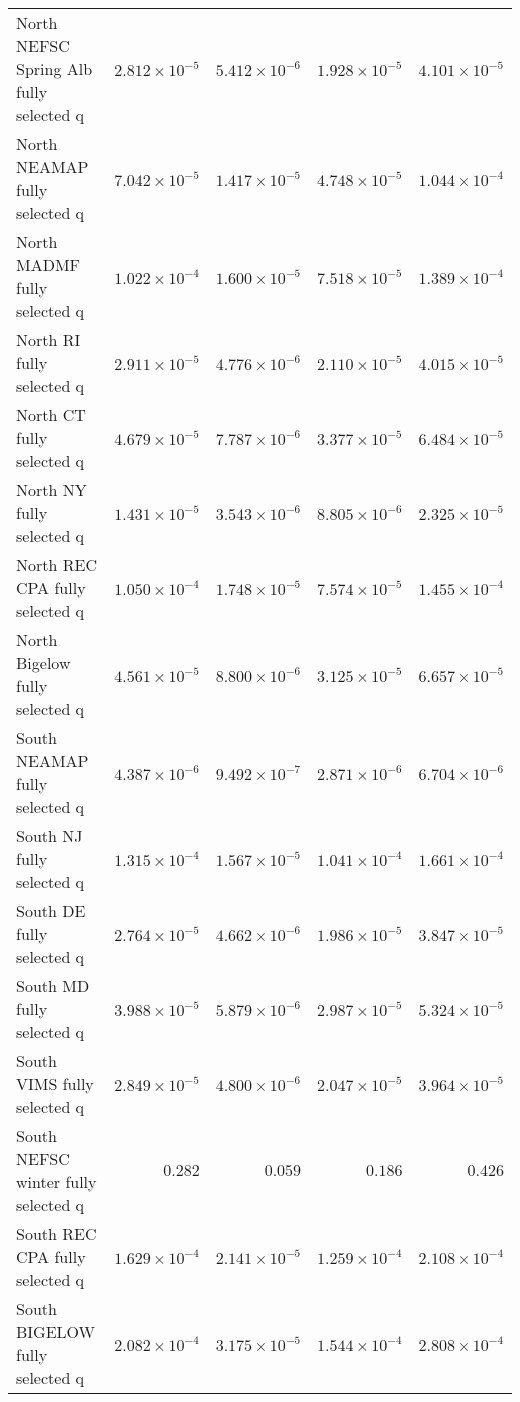 \documentclass[
]{article}
\begin{document}
\begin{landscape}
\begin{longtable}[t]{lrrrr}
\addlinespace
North NEFSC Spring Alb fully selected q & $2.812\times 10^{-5}$ & $5.412\times 10^{-6}$ & $1.928\times 10^{-5}$ & $4.101\times 10^{-5}$\\
North NEAMAP fully selected q & $7.042\times 10^{-5}$ & $1.417\times 10^{-5}$ & $4.748\times 10^{-5}$ & $1.044\times 10^{-4}$\\
North MADMF fully selected q & $1.022\times 10^{-4}$ & $1.600\times 10^{-5}$ & $7.518\times 10^{-5}$ & $1.389\times 10^{-4}$\\
North RI fully selected q & $2.911\times 10^{-5}$ & $4.776\times 10^{-6}$ & $2.110\times 10^{-5}$ & $4.015\times 10^{-5}$\\
North CT fully selected q & $4.679\times 10^{-5}$ & $7.787\times 10^{-6}$ & $3.377\times 10^{-5}$ & $6.484\times 10^{-5}$\\
\addlinespace
North NY fully selected q & $1.431\times 10^{-5}$ & $3.543\times 10^{-6}$ & $8.805\times 10^{-6}$ & $2.325\times 10^{-5}$\\
North REC CPA fully selected q & $1.050\times 10^{-4}$ & $1.748\times 10^{-5}$ & $7.574\times 10^{-5}$ & $1.455\times 10^{-4}$\\
North Bigelow fully selected q & $4.561\times 10^{-5}$ & $8.800\times 10^{-6}$ & $3.125\times 10^{-5}$ & $6.657\times 10^{-5}$\\
South NEAMAP fully selected q & $4.387\times 10^{-6}$ & $9.492\times 10^{-7}$ & $2.871\times 10^{-6}$ & $6.704\times 10^{-6}$\\
South NJ fully selected q & $1.315\times 10^{-4}$ & $1.567\times 10^{-5}$ & $1.041\times 10^{-4}$ & $1.661\times 10^{-4}$\\
\addlinespace
South DE fully selected q & $2.764\times 10^{-5}$ & $4.662\times 10^{-6}$ & $1.986\times 10^{-5}$ & $3.847\times 10^{-5}$\\
South MD fully selected q & $3.988\times 10^{-5}$ & $5.879\times 10^{-6}$ & $2.987\times 10^{-5}$ & $5.324\times 10^{-5}$\\
South VIMS fully selected q & $2.849\times 10^{-5}$ & $4.800\times 10^{-6}$ & $2.047\times 10^{-5}$ & $3.964\times 10^{-5}$\\
South NEFSC winter fully selected q & $0.282$ & $0.059$ & $0.186$ & $0.426$\\
South REC CPA fully selected q & $1.629\times 10^{-4}$ & $2.141\times 10^{-5}$ & $1.259\times 10^{-4}$ & $2.108\times 10^{-4}$\\
\addlinespace
South BIGELOW fully selected q & $2.082\times 10^{-4}$ & $3.175\times 10^{-5}$ & $1.544\times 10^{-4}$ & $2.808\times 10^{-4}$\\

\end{longtable}
\end{landscape}
\end{document}
